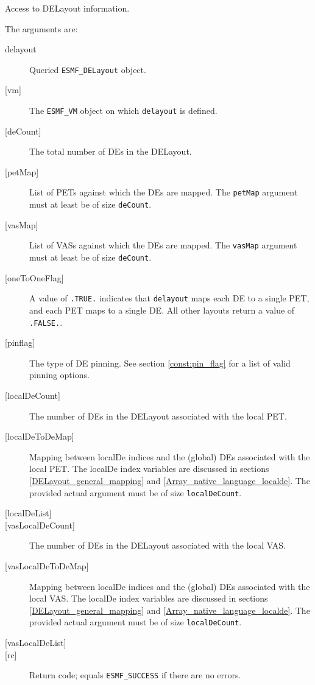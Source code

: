      Access to DELayout information.
  
     The arguments are:
     \begin{description}
     \item[delayout] 
       Queried {\tt ESMF\_DELayout} object.
     \item[{[vm]}]
       The {\tt ESMF\_VM} object on which {\tt delayout} is defined.
     \item[{[deCount]}]
       The total number of DEs in the DELayout.
     \item[{[petMap]}]
       List of PETs against which the DEs are mapped. The {\tt petMap} 
       argument must at least be of size {\tt deCount}.
     \item[{[vasMap]}]
       List of VASs against which the DEs are mapped. The {\tt vasMap}
       argument must at least be of size {\tt deCount}.
     \item[{[oneToOneFlag]}]
       A value of {\tt .TRUE.} indicates that {\tt delayout} maps each DE to a
       single PET, and each PET maps to a single DE. All other layouts return
       a value of {\tt .FALSE.}.
     \item[{[pinflag]}]
       The type of DE pinning. See section \ref{const:pin_flag} for a list
       of valid pinning options.
     \item[{[localDeCount]}]
       The number of DEs in the DELayout associated with the local PET.
     \item[{[localDeToDeMap]}]
       Mapping between localDe indices and the (global) DEs associated with
       the local PET. The localDe index variables are discussed in sections
       \ref{DELayout_general_mapping} and \ref{Array_native_language_localde}.
       The provided actual argument must be of size {\tt localDeCount}.
     \item[{[localDeList]}]
     \item[{[vasLocalDeCount]}]
       The number of DEs in the DELayout associated with the local VAS.
     \item[{[vasLocalDeToDeMap]}]
       Mapping between localDe indices and the (global) DEs associated with
       the local VAS. The localDe index variables are discussed in sections
       \ref{DELayout_general_mapping} and \ref{Array_native_language_localde}.
       The provided actual argument must be of size {\tt localDeCount}.
     \item[{[vasLocalDeList]}]
     \item[{[rc]}] 
       Return code; equals {\tt ESMF\_SUCCESS} if there are no errors.
     \end{description}
   
